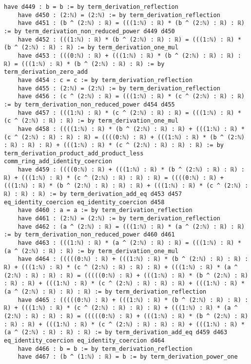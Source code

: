 \documentclass{article}
\begin{document}
\begin{tcolorbox}[colback=white!10, width=\linewidth]
\begin{lstlisting}[language=Lean4]
    have d449 : b = b := by term_derivation_reflection
    have d450 : (2:ℕ) = (2:ℕ) := by term_derivation_reflection
    have d451 : (b ^ (2:ℕ) : ℝ) = (((1:ℕ) : ℝ) * (b ^ (2:ℕ) : ℝ) : ℝ) := by term_derivation_non_reduced_power d449 d450
    have d452 : (((1:ℕ) : ℝ) * (b ^ (2:ℕ) : ℝ) : ℝ) = (((1:ℕ) : ℝ) * (b ^ (2:ℕ) : ℝ) : ℝ) := by term_derivation_one_mul
    have d453 : (((0:ℕ) : ℝ) + (((1:ℕ) : ℝ) * (b ^ (2:ℕ) : ℝ) : ℝ) : ℝ) = (((1:ℕ) : ℝ) * (b ^ (2:ℕ) : ℝ) : ℝ) := by term_derivation_zero_add
    have d454 : c = c := by term_derivation_reflection
    have d455 : (2:ℕ) = (2:ℕ) := by term_derivation_reflection
    have d456 : (c ^ (2:ℕ) : ℝ) = (((1:ℕ) : ℝ) * (c ^ (2:ℕ) : ℝ) : ℝ) := by term_derivation_non_reduced_power d454 d455
    have d457 : (((1:ℕ) : ℝ) * (c ^ (2:ℕ) : ℝ) : ℝ) = (((1:ℕ) : ℝ) * (c ^ (2:ℕ) : ℝ) : ℝ) := by term_derivation_one_mul
    have d458 : ((((1:ℕ) : ℝ) * (b ^ (2:ℕ) : ℝ) : ℝ) + (((1:ℕ) : ℝ) * (c ^ (2:ℕ) : ℝ) : ℝ) : ℝ) = ((((0:ℕ) : ℝ) + (((1:ℕ) : ℝ) * (b ^ (2:ℕ) : ℝ) : ℝ) : ℝ) + (((1:ℕ) : ℝ) * (c ^ (2:ℕ) : ℝ) : ℝ) : ℝ) := by term_derivation_product_add_product_less comm_ring_add_identity_coercion
    have d459 : ((((0:ℕ) : ℝ) + (((1:ℕ) : ℝ) * (b ^ (2:ℕ) : ℝ) : ℝ) : ℝ) + (((1:ℕ) : ℝ) * (c ^ (2:ℕ) : ℝ) : ℝ) : ℝ) = ((((0:ℕ) : ℝ) + (((1:ℕ) : ℝ) * (b ^ (2:ℕ) : ℝ) : ℝ) : ℝ) + (((1:ℕ) : ℝ) * (c ^ (2:ℕ) : ℝ) : ℝ) : ℝ) := by term_derivation_add_eq d453 d457 eq_identity_coercion eq_identity_coercion d458
    have d460 : a = a := by term_derivation_reflection
    have d461 : (2:ℕ) = (2:ℕ) := by term_derivation_reflection
    have d462 : (a ^ (2:ℕ) : ℝ) = (((1:ℕ) : ℝ) * (a ^ (2:ℕ) : ℝ) : ℝ) := by term_derivation_non_reduced_power d460 d461
    have d463 : (((1:ℕ) : ℝ) * (a ^ (2:ℕ) : ℝ) : ℝ) = (((1:ℕ) : ℝ) * (a ^ (2:ℕ) : ℝ) : ℝ) := by term_derivation_one_mul
    have d464 : (((((0:ℕ) : ℝ) + (((1:ℕ) : ℝ) * (b ^ (2:ℕ) : ℝ) : ℝ) : ℝ) + (((1:ℕ) : ℝ) * (c ^ (2:ℕ) : ℝ) : ℝ) : ℝ) + (((1:ℕ) : ℝ) * (a ^ (2:ℕ) : ℝ) : ℝ) : ℝ) = (((((0:ℕ) : ℝ) + (((1:ℕ) : ℝ) * (b ^ (2:ℕ) : ℝ) : ℝ) : ℝ) + (((1:ℕ) : ℝ) * (c ^ (2:ℕ) : ℝ) : ℝ) : ℝ) + (((1:ℕ) : ℝ) * (a ^ (2:ℕ) : ℝ) : ℝ) : ℝ) := by term_derivation_reflection
    have d465 : (((((0:ℕ) : ℝ) + (((1:ℕ) : ℝ) * (b ^ (2:ℕ) : ℝ) : ℝ) : ℝ) + (((1:ℕ) : ℝ) * (c ^ (2:ℕ) : ℝ) : ℝ) : ℝ) + (((1:ℕ) : ℝ) * (a ^ (2:ℕ) : ℝ) : ℝ) : ℝ) = (((((0:ℕ) : ℝ) + (((1:ℕ) : ℝ) * (b ^ (2:ℕ) : ℝ) : ℝ) : ℝ) + (((1:ℕ) : ℝ) * (c ^ (2:ℕ) : ℝ) : ℝ) : ℝ) + (((1:ℕ) : ℝ) * (a ^ (2:ℕ) : ℝ) : ℝ) : ℝ) := by term_derivation_add_eq d459 d463 eq_identity_coercion eq_identity_coercion d464
    have d466 : b = b := by term_derivation_reflection
    have d467 : (b ^ (1:ℕ) : ℝ) = b := by term_derivation_power_one

\end{lstlisting}
\end{tcolorbox}
\end{document}
